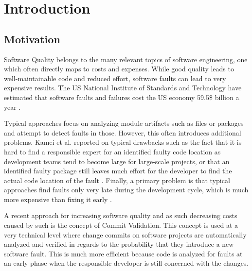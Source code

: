 \section{Introduction}
\label{sec:intro}

\subsection{Motivation}

Software Quality belongs to the many relevant topics of software engineering, one which often directly maps to costs and expenses. While good quality leads to well-maintainable code and reduced effort, software faults can lead to very expensive results. The US National Institute of Standards and Technology have estimated that software faults and failures cost the US economy 59.5\$ billion a year \cite{Rosen2015,nist}.

Typical approaches focus on analyzing module artifacts such as files or packages and attempt to detect faults in those. However, this often introduces additional problems. Kamei et al. reported on typical drawbacks such as the fact that it is hard to find a responsible expert for an identified faulty code location as development teams tend to become large for large-scale projects, or that an identified faulty package still leaves much effort for the developer to find the actual code location of the fault \cite{Kamei2013}. Finally, a primary problem is that typical approaches find faults only very late during the development cycle, which is much more expensive than fixing it early \cite{Martin08}.

A recent approach for increasing software quality and as such decreasing costs caused by such is the concept of Commit Validation. This concept is used at a very technical level where change commits on software projects are automatically analyzed and verified in regards to the probability that they introduce a new software fault. This is much more efficient because code is analyzed for faults at an early phase when the responsible developer is still concerned with the changes. \cite{Kamei2013}

